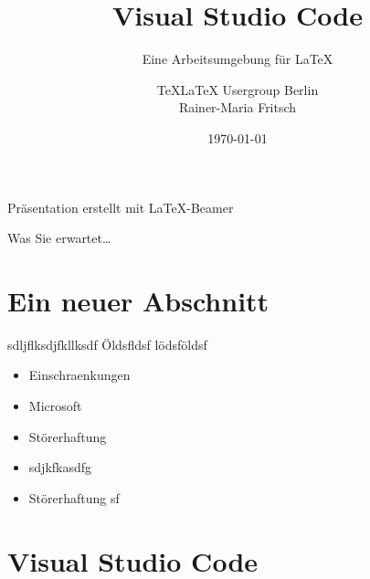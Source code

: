 \documentclass[t, %
							xcolor=dvipsnames,%
							hyperref={bookmarks,colorlinks},%
							]%
							{beamer}
\title[Kurzer Titel]{Visual Studio Code}
\subtitle[]{Eine Arbeitsumgebung für \LaTeX}
\author[RMF]{TeXLaTeX Usergroup Berlin\\\small{Rainer-Maria Fritsch}}
\date[\today]{\today}
\begin{document}
	\begin{frame}{}
		\maketitle
		\begin{center} 
			\tiny{Präsentation erstellt mit {\LaTeX}-Beamer} 
		\end{center}
		
	\end{frame}
	
	\begin{frame}{Was Sie erwartet\ldots}
		\setcounter{tocdepth}{1}
		\tableofcontents
	\end{frame}
	
	\AtBeginSection[]{
		\begin{frame}
		\setcounter{tocdepth}{2}
		\tableofcontents[currentsection]
    \end{frame}
	}
	
	\section{Ein neuer Abschnitt}
	\label{sec:EinneuerAbschnitt}
		sdljflksdjfkllksdf
		Öldsfldsf
		lödsföldsf
		\begin{itemize}
			\item Einschraenkungen
			\item Microsoft
			\item Störerhaftung
			\item sdjkfkasdfg
			\item Störerhaftung sf 
		\end{itemize}
  
  \section{Visual Studio Code}
  \label{sec:VisualStudioCode}
\end{document}
